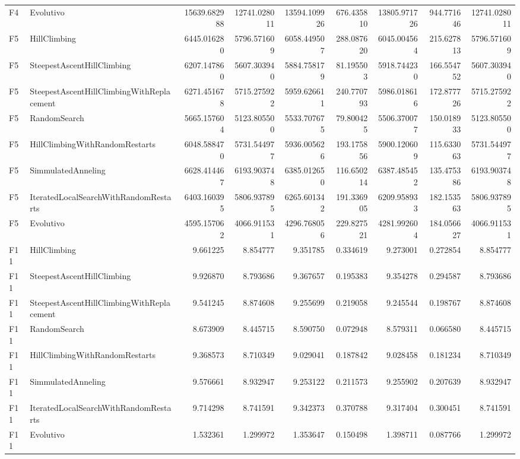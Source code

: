\begin{tabular}{llrrrrrrr}
F4 & Evolutivo & 15639.682988 & 12741.028011 & 13594.109926 & 676.435810 & 13805.971726 & 944.771646 & 12741.028011 \\
F5 & HillClimbing & 6445.016280 & 5796.571609 & 6058.449507 & 288.087620 & 6045.004564 & 215.627813 & 5796.571609 \\
F5 & SteepestAscentHillClimbing & 6207.147860 & 5607.303940 & 5884.758179 & 81.195503 & 5918.744230 & 166.554752 & 5607.303940 \\
F5 & SteepestAscentHillClimbingWithReplacement & 6271.451678 & 5715.275922 & 5959.626611 & 240.770793 & 5986.018616 & 172.877726 & 5715.275922 \\
F5 & RandomSearch & 5665.157604 & 5123.805500 & 5533.707675 & 79.800425 & 5506.370077 & 150.018933 & 5123.805500 \\
F5 & HillClimbingWithRandomRestarts & 6048.588470 & 5731.544977 & 5936.005626 & 193.175856 & 5900.120609 & 115.633063 & 5731.544977 \\
F5 & SimmulatedAnneling & 6628.414467 & 6193.903748 & 6385.012650 & 116.650214 & 6387.485452 & 135.475386 & 6193.903748 \\
F5 & IteratedLocalSearchWithRandomRestarts & 6403.160395 & 5806.937895 & 6265.601342 & 191.336905 & 6209.958933 & 182.153563 & 5806.937895 \\
F5 & Evolutivo & 4595.157062 & 4066.911531 & 4296.768056 & 229.827521 & 4281.992604 & 184.056627 & 4066.911531 \\
F11 & HillClimbing & 9.661225 & 8.854777 & 9.351785 & 0.334619 & 9.273001 & 0.272854 & 8.854777 \\
F11 & SteepestAscentHillClimbing & 9.926870 & 8.793686 & 9.367657 & 0.195383 & 9.354278 & 0.294587 & 8.793686 \\
F11 & SteepestAscentHillClimbingWithReplacement & 9.541245 & 8.874608 & 9.255699 & 0.219058 & 9.245544 & 0.198767 & 8.874608 \\
F11 & RandomSearch & 8.673909 & 8.445715 & 8.590750 & 0.072948 & 8.579311 & 0.066580 & 8.445715 \\
F11 & HillClimbingWithRandomRestarts & 9.368573 & 8.710349 & 9.029041 & 0.187842 & 9.028458 & 0.181234 & 8.710349 \\
F11 & SimmulatedAnneling & 9.576661 & 8.932947 & 9.253122 & 0.211573 & 9.255902 & 0.207639 & 8.932947 \\
F11 & IteratedLocalSearchWithRandomRestarts & 9.714298 & 8.741591 & 9.342373 & 0.370788 & 9.317404 & 0.300451 & 8.741591 \\
F11 & Evolutivo & 1.532361 & 1.299972 & 1.353647 & 0.150498 & 1.398711 & 0.087766 & 1.299972 \\
\bottomrule
\end{tabular}
